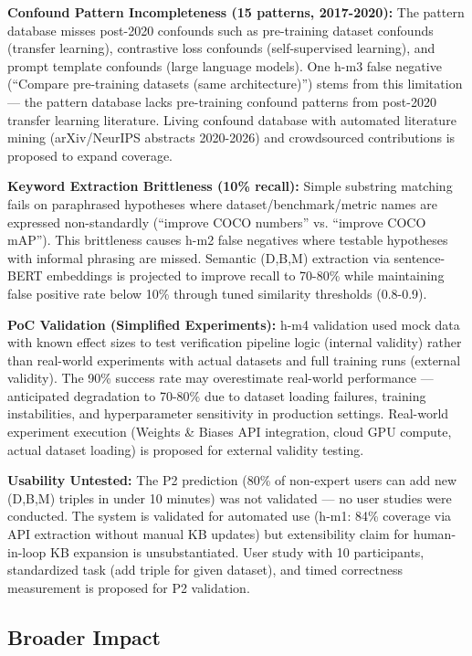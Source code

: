 \textbf{Confound Pattern Incompleteness (15 patterns, 2017-2020):} The pattern database misses post-2020 confounds such as pre-training dataset confounds (transfer learning), contrastive loss confounds (self-supervised learning), and prompt template confounds (large language models). One h-m3 false negative (``Compare pre-training datasets (same architecture)'') stems from this limitation --- the pattern database lacks pre-training confound patterns from post-2020 transfer learning literature. Living confound database with automated literature mining (arXiv/NeurIPS abstracts 2020-2026) and crowdsourced contributions is proposed to expand coverage.

\textbf{Keyword Extraction Brittleness (10\% recall):} Simple substring matching fails on paraphrased hypotheses where dataset/benchmark/metric names are expressed non-standardly (``improve COCO numbers'' vs. ``improve COCO mAP''). This brittleness causes h-m2 false negatives where testable hypotheses with informal phrasing are missed. Semantic (D,B,M) extraction via sentence-BERT embeddings is projected to improve recall to 70-80\% while maintaining false positive rate below 10\% through tuned similarity thresholds (0.8-0.9).

\textbf{PoC Validation (Simplified Experiments):} h-m4 validation used mock data with known effect sizes to test verification pipeline logic (internal validity) rather than real-world experiments with actual datasets and full training runs (external validity). The 90\% success rate may overestimate real-world performance --- anticipated degradation to 70-80\% due to dataset loading failures, training instabilities, and hyperparameter sensitivity in production settings. Real-world experiment execution (Weights \& Biases API integration, cloud GPU compute, actual dataset loading) is proposed for external validity testing.

\textbf{Usability Untested:} The P2 prediction (80\% of non-expert users can add new (D,B,M) triples in under 10 minutes) was not validated --- no user studies were conducted. The system is validated for automated use (h-m1: 84\% coverage via API extraction without manual KB updates) but extensibility claim for human-in-loop KB expansion is unsubstantiated. User study with 10 participants, standardized task (add triple for given dataset), and timed correctness measurement is proposed for P2 validation.

\subsection{Broader Impact}


